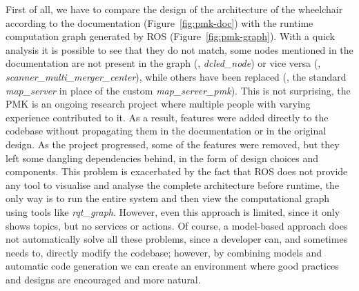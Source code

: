 First of all, we have to compare the design of the architecture of the wheelchair according to the documentation (Figure~\ref{fig:pmk-doc}) with the runtime computation graph generated by ROS (Figure~\ref{fig:pmk-graph}). With a quick analysis it is possible to see that they do not match, some nodes mentioned in the documentation are not present in the graph (\eg, \textit{dcled\_node}) or vice versa (\eg, \textit{scanner\_multi\_merger\_center}), while others have been replaced (\eg, the standard \textit{map\_server} in place of the custom \textit{map\_server\_pmk}). This is not surprising, the PMK is an ongoing research project where multiple people with varying experience contributed to it. As a result, features were added directly to the codebase without propagating them in the documentation or in the original design. As the project progressed, some of the features were removed, but they left some dangling dependencies behind, in the form of design choices and components. This problem is exacerbated by the fact that ROS does not provide any tool to visualise and analyse the complete architecture before runtime, the only way is to run the entire system and then view the computational graph using tools like \textit{rqt\_graph}. However, even this approach is limited, since it only shows topics, but no services or actions. Of course, a model-based approach does not automatically solve all these problems, since a developer can, and sometimes needs to, directly modify the codebase; however, by combining models and automatic code generation we can create an environment where good practices and designs are encouraged and more natural.

